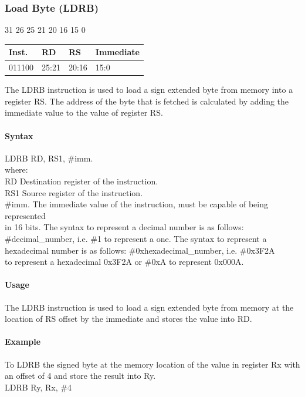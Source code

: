 \documentclass[12pt]{article}
\newcommand{\iTypeInstruction}[6]
{%
    \hspace{1.6cm}31 \hspace{1.15cm}26 \hspace{.05cm}25 \hspace{.8cm}21 \hspace{.05cm}20 \hspace{.8cm}16 \hspace{.05cm}15 \hspace{6.4cm}0
    \vspace{-.25cm}
    \begin{center}
        \begin{tabular}{ |p{1.8cm}|p{1.5cm}|p{1.5cm}|p{6.8cm}| }
            \hline
            \textbf{Inst.} & \textbf{RD} &  \textbf{RS} & \textbf{Immediate}\\
            \hline
            #1 & 25:21 & 20:16 &15:0\\
            \hline
        \end{tabular}
    \end{center}
    
    \noindent
    #2
    
    \paragraph{Syntax}
    \begin{flushleft}
    #3 RD, RS1, \#imm.\\
    \vspace{1em}        %
    where:\\
    \vspace{1em}
    RD  \hspace{3.6em} Destination register of the instruction.\\
    \vspace{1em}
    RS1  \hspace{3.35em} Source register of the instruction.\\
    \vspace{1em}
    \#imm.  \hspace{1.8em} The immediate value of the instruction, must be capable of being represented\\             \hspace{5.4em} in 16 bits. The syntax to represent a decimal number is as follows:\\
            \hspace{5.4em} \#decimal\_number, i.e. \#1 to represent a one. The syntax to represent a\\
            \hspace{5.4em} hexadecimal number is as follows: \#0xhexadecimal\_number, i.e. \#0x3F2A \\
            \hspace{5.4em} to represent a hexadecimal 0x3F2A or \#0xA to represent 0x000A.\\
    \end{flushleft}
    
    \paragraph{Usage}
    \begin{flushleft}
    #4\\
    \end{flushleft}
    \paragraph{Example}
    \begin{flushleft}
    #5\\
    \vspace{1em}
    #6
    \end{flushleft}}
\begin{document}

    \newpage
    \subsubsection{Load Byte (LDRB)}
    
    \iTypeInstruction
    {011100}
    {The LDRB instruction is used to load a sign extended byte from memory into a register RS. The address of the byte that is fetched is calculated by adding the immediate value to the value of register RS.}
    {LDRB}
    {The LDRB instruction is used to load a sign extended byte from memory at the location of RS offset by the immediate and stores the value into RD.}
    {To LDRB the signed byte at the memory location of the value in register Rx with an offset of 4 and store the result into Ry.}
    {LDRB Ry, Rx, \#4}
    
    
    
\end{document}
